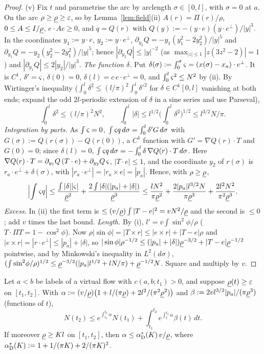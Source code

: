 \begin{proof}
(v) Fix $t$ and parametrise the arc by arclength $\sigma\in[0,l]$, with $\sigma=0$ at $a$. On the arc $\rho\ge\underline\rho\ge\varepsilon$, so
by Lemma~\ref{lem:field}(ii) $A(r)=\Pi(r)/\rho$, $0\le A\le I/\underline\rho$, $e\cdot Ae\ge0$, and $q=Q(r)$ with
$Q(y):=-(y\cdot e)(y\cdot e^\perp)/|y|^3$. In the coordinates $y_1:=y\cdot e$, $y_2:=y\cdot e^\perp$,
$\partial_{y_2}Q=-y_1(y_1^2-2y_2^2)/|y|^5$ and $\partial_{y_1}Q=-y_2(y_2^2-2y_1^2)/|y|^5$; hence $|\partial_{y_2}Q|\le|y|^{-2}$
(as $\max_{|z|\le1}|z(3z^2-2)|=1$) and $|\partial_{y_1}Q|\le2|y_2|/|y|^3$.
\emph{The function $\delta$.} Put $\delta(\sigma):=\int_0^\sigma\varsigma=(x(\sigma)-x_a)\cdot e^\perp$. It is $C^1$, $\delta'=\varsigma$,
$\delta(0)=0$, $\delta(l)=c\,e\cdot e^\perp=0$, and $\int_0^l\varsigma^2\le N^2$ by (ii). By Wirtinger's inequality
\cite[Thm.~257]{HLP} ($\int_0^l\delta^2\le(l/\pi)^2\int_0^l\delta'^2$ for $\delta\in C^1[0,l]$ vanishing at both ends; expand the odd
$2l$-periodic extension of $\delta$ in a sine series and use Parseval),
\[
\textstyle\int_0^l\delta^2\le(l/\pi)^2N^2,\qquad\int_0^l|\delta|\le l^{1/2}\bigl(\int_0^l\delta^2\bigr)^{1/2}\le l^{3/2}N/\pi .
\]
\emph{Integration by parts.} As $\int\varsigma=0$, $\int\varsigma q\,d\sigma=\int_0^l\delta'G\,d\sigma$ with $G(\sigma):=Q(r(\sigma))-Q(r(0))$, a
$C^1$ function with $G'=\nabla Q(r)\cdot T$ and $G(0)=0$; since $\delta(l)=0$, $\int\varsigma q\,d\sigma=-\int_0^l\delta\,\nabla Q(r)\cdot T\,d\sigma$.
Here $\nabla Q(r)\cdot T=\partial_{y_1}Q\,(T\cdot e)+\partial_{y_2}Q\,\varsigma$, $|T\cdot e|\le1$, and the coordinate $y_2$ of $r(\sigma)$ is
$r_a\cdot e^\perp+\delta(\sigma)$, with $|r_a\cdot e^\perp|=|r_a\times e|=|p_a|$. Hence, with $\rho\ge\underline\rho$,
\[
\Bigl|\int\varsigma q\Bigr|\le\frac{\int|\delta||\varsigma|}{\underline\rho^2}+\frac{2\int|\delta|(|p_a|+|\delta|)}{\underline\rho^3}
\le\frac{lN^2}{\pi\underline\rho^2}+\frac{2|p_a|l^{3/2}N}{\pi\underline\rho^3}+\frac{2l^2N^2}{\pi^2\underline\rho^3}.
\]
\emph{Excess.} In (ii) the first term is $\le(v/\underline\rho)\int|T-e|^2=vN^2/\underline\rho$ and the second is $\le0$; add $v$ times the last
bound. \emph{Length.} By (i), $l'=v\int\sin^2\!\phi/\rho$ ($T\cdot\Pi T=1-\cos^2\phi$). Now $\rho|\sin\phi|=|T\times r|\le|e\times r|+|T-e|\rho$
and $|e\times r|=|r\cdot e^\perp|\le|p_a|+|\delta|$, so $|\sin\phi|\rho^{-1/2}\le(|p_a|+|\delta|)\underline\rho^{-3/2}+|T-e|\underline\rho^{-1/2}$
pointwise, and by Minkowski's inequality in $L^2(d\sigma)$,
$(\int\sin^2\!\phi/\rho)^{1/2}\le\underline\rho^{-3/2}(|p_a|l^{1/2}+lN/\pi)+\underline\rho^{-1/2}N$. Square and multiply by $v$.
\end{proof}

\begin{lemma}\label{lem:duhamel}
Let $a<b$ be labels of a virtual flow with $c(a,b;t_1)>0$, and suppose $\underline\rho(t)\ge\varepsilon$ on $[t_1,t_2]$. With
$\alpha:=(v/\underline\rho)\bigl(1+l/(\pi\underline\rho)+2l^2/(\pi^2\underline\rho^2)\bigr)$ and $\beta:=2vl^{3/2}|p_a|/(\pi\underline\rho^3)$ \textup(functions
of $t$\textup),
\[
N(t_2)\le e^{\int_{t_1}^{t_2}\alpha}N(t_1)+\int_{t_1}^{t_2}e^{\int_t^{t_2}\alpha}\beta(t)\,dt .
\]
If moreover $\underline\rho\ge Kl$ on $[t_1,t_2]$, then $\alpha\le\alpha^*_{\mathrm D}(K)\,v/\underline\rho$, where $\alpha^*_{\mathrm D}(K):=1+1/(\pi K)+2/(\pi K)^2$.
\end{lemma}

